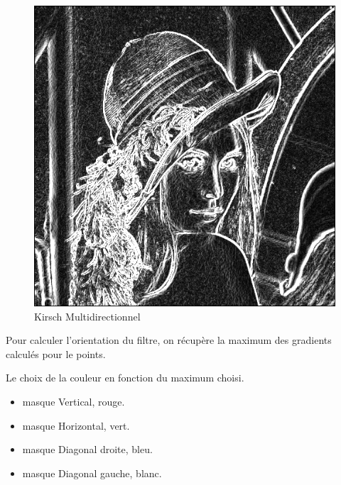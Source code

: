 \documentclass[11pt]{article}
\begin{document}
	\begin{figure}[H]
		\centering
		\includegraphics[scale=0.25]{Image/filtreKirschMultidirectionnel.png}
		\caption{Kirsch Multidirectionnel}
		\label{fig:KirschMultidirectionnel}
	\end{figure}

	Pour calculer l'orientation du filtre, on récupère la maximum des gradients calculés pour le points.

	Le choix de la couleur en fonction du maximum choisi.

	\begin{itemize}
	\item masque Vertical, rouge.
	\item masque Horizontal, vert.
	\item masque Diagonal droite, bleu.
	\item masque Diagonal gauche, blanc.
	\end{itemize}
            
\end{document}
